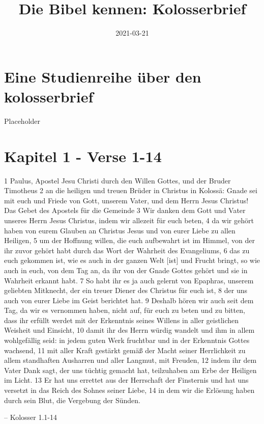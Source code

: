 \documentclass[
  12pt,
]{krantz}
\title{Die Bibel kennen: Kolosserbrief}
\author{}
\date{\vspace{-2.5em}2021-03-21}
\makeatletter
\newenvironment{kframe}{%
\medskip{}
\setlength{\fboxsep}{.8em}
 \def\at@end@of@kframe{}%
 \ifinner\ifhmode%
  \def\at@end@of@kframe{\end{minipage}}%
  \begin{minipage}{\columnwidth}%
 \fi\fi%
 \def\FrameCommand##1{\hskip\@totalleftmargin \hskip-\fboxsep
 \colorbox{shadecolor}{##1}\hskip-\fboxsep
     \hskip-\linewidth \hskip-\@totalleftmargin \hskip\columnwidth}%
 \MakeFramed {\advance\hsize-\width
   \@totalleftmargin\z@ \linewidth\hsize
   \@setminipage}}%
 {\par\unskip\endMakeFramed%
 \at@end@of@kframe}
\newenvironment{rmdblock}[1]
  {
  \begin{itemize}
  \renewcommand{\labelitemi}{
    \raisebox{-.7\height}[0pt][0pt]{
      {\setkeys{Gin}{width=3em,keepaspectratio}\texttt{[image: img/\#1]}}
    }
  }
  \setlength{\fboxsep}{1em}
  \begin{kframe}
  \item
  }
  {
  \end{kframe}
  \end{itemize}
  }
\newenvironment{rmdquote}
  {\begin{rmdblock}{quote}}
  {\end{rmdblock}}
\makeatother
\begin{document}
\maketitle

\thispagestyle{empty}
\mainmatter

{
\hypersetup{linkcolor=}
\setcounter{tocdepth}{2}
\tableofcontents
}
\hypertarget{eine-studienreihe-uxfcber-den-kolosserbrief}{%
\chapter{Eine Studienreihe über den kolosserbrief}\label{eine-studienreihe-uxfcber-den-kolosserbrief}}

Placeholder

\hypertarget{teil_01_1_14}{%
\chapter{Kapitel 1 - Verse 1-14}\label{teil_01_1_14}}

\begin{rmdquote}
1 Paulus, Apostel Jesu Christi durch den Willen Gottes, und der Bruder
Timotheus 2 an die heiligen und treuen Brüder in Christus in Kolossä:
Gnade sei mit euch und Friede von Gott, unserem Vater, und dem Herrn
Jesus Christus! Das Gebet des Apostels für die Gemeinde 3 Wir danken dem
Gott und Vater unseres Herrn Jesus Christus, indem wir allezeit für euch
beten, 4 da wir gehört haben von eurem Glauben an Christus Jesus und von
eurer Liebe zu allen Heiligen, 5 um der Hoffnung willen, die euch
aufbewahrt ist im Himmel, von der ihr zuvor gehört habt durch das Wort
der Wahrheit des Evangeliums, 6 das zu euch gekommen ist, wie es auch in
der ganzen Welt {[}ist{]} und Frucht bringt, so wie auch in euch, von
dem Tag an, da ihr von der Gnade Gottes gehört und sie in Wahrheit
erkannt habt. 7 So habt ihr es ja auch gelernt von Epaphras, unserem
geliebten Mitknecht, der ein treuer Diener des Christus für euch ist, 8
der uns auch von eurer Liebe im Geist berichtet hat. 9 Deshalb hören wir
auch seit dem Tag, da wir es vernommen haben, nicht auf, für euch zu
beten und zu bitten, dass ihr erfüllt werdet mit der Erkenntnis seines
Willens in aller geistlichen Weisheit und Einsicht, 10 damit ihr des
Herrn würdig wandelt und ihm in allem wohlgefällig seid: in jedem guten
Werk fruchtbar und in der Erkenntnis Gottes wachsend, 11 mit aller Kraft
gestärkt gemäß der Macht seiner Herrlichkeit zu allem standhaften
Ausharren und aller Langmut, mit Freuden, 12 indem ihr dem Vater Dank
sagt, der uns tüchtig gemacht hat, teilzuhaben am Erbe der Heiligen im
Licht. 13 Er hat uns errettet aus der Herrschaft der Finsternis und hat
uns versetzt in das Reich des Sohnes seiner Liebe, 14 in dem wir die
Erlösung haben durch sein Blut, die Vergebung der Sünden.

-- Kolosser 1.1-14
\end{rmdquote}
\end{document}
